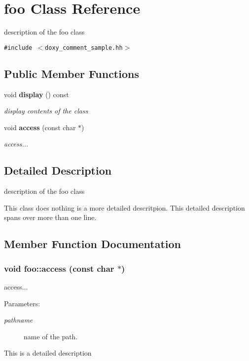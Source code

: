 \section{foo Class Reference}
\label{classfoo}
description of the foo class  


{\tt \#include $<$doxy\_\-comment\_\-sample.hh$>$}

\subsection*{Public Member Functions}
\begin{CompactItemize}
\item 
void {\bf display} () const 
\begin{CompactList}\small\item\em display contents of the class \item\end{CompactList}\item 
void {\bf access} (const char $\ast$)
\begin{CompactList}\small\item\em access... \item\end{CompactList}\end{CompactItemize}


\subsection{Detailed Description}
description of the foo class 

This class does nothing is a more detailed descritpion. This detailed description spans over more than one line. 



\subsection{Member Function Documentation}
\subsubsection{\setlength{\rightskip}{0pt plus 5cm}void foo::access (const char $\ast$)}\label{classfoo_a57c97b36afcf12d8f82f3759a2e4f43}


access... 

\begin{Desc}
\item[Parameters:]
\begin{description}
\item[{\em pathname}]name of the path.\end{description}
\end{Desc}
This is a detailed description 
